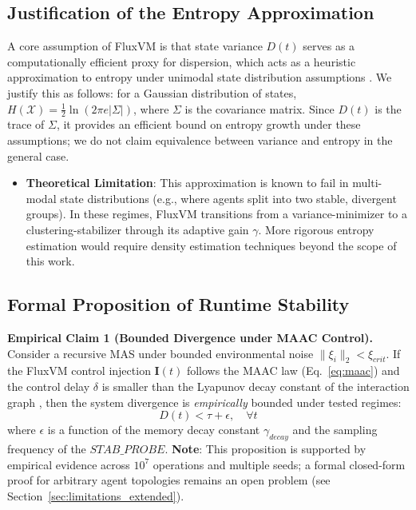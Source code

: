 \documentclass{article}
\begin{document}
\subsection{Justification of the Entropy Approximation}
A core assumption of FluxVM is that state variance $D(t)$ serves as a computationally efficient proxy for dispersion, which acts as a heuristic approximation to entropy under unimodal state distribution assumptions \cite{cover1999elements}. We justify this as follows: for a Gaussian distribution of states, $H(\mathcal{X}) = \frac{1}{2} \ln(2\pi e |\Sigma|)$, where $\Sigma$ is the covariance matrix. Since $D(t)$ is the trace of $\Sigma$, it provides an efficient bound on entropy growth under these assumptions; we do not claim equivalence between variance and entropy in the general case.
\begin{itemize}
    \item \textbf{Theoretical Limitation}: This approximation is known to fail in multi-modal state distributions (e.g., where agents split into two stable, divergent groups). In these regimes, FluxVM transitions from a variance-minimizer to a clustering-stabilizer through its adaptive gain $\gamma$. More rigorous entropy estimation would require density estimation techniques beyond the scope of this work.
\end{itemize}

\subsection{Formal Proposition of Runtime Stability}
\textbf{Empirical Claim 1 (Bounded Divergence under MAAC Control).} 
Consider a recursive MAS under bounded environmental noise $\|\xi_i\|_2 < \xi_{crit}$. If the FluxVM control injection $\mathbf{I}(t)$ follows the MAAC law (Eq.~\ref{eq:maac}) and the control delay $\delta$ is smaller than the Lyapunov decay constant of the interaction graph \cite{khalil2002nonlinear}, then the system divergence is \emph{empirically} bounded under tested regimes:
\begin{equation}
    D(t) < \tau + \epsilon, \quad \forall t
\end{equation}
where $\epsilon$ is a function of the memory decay constant $\gamma_{decay}$ and the sampling frequency of the $STAB\_PROBE$. \textbf{Note}: This proposition is supported by empirical evidence across $10^7$ operations and multiple seeds; a formal closed-form proof for arbitrary agent topologies remains an open problem (see Section~\ref{sec:limitations_extended}).
\end{document}
